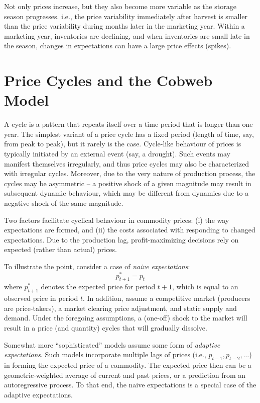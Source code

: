 \documentclass[
  oneside]{book}
\begin{document}
Not only prices increase, but they also become more variable as the storage season progresses. i.e., the price variability immediately after harvest is smaller than the price variability during months later in the marketing year. Within a marketing year, inventories are declining, and when inventories are small late in the season, changes in expectations can have a large price effects (spikes).

\hypertarget{price-cycles-and-the-cobweb-model}{%
\section{Price Cycles and the Cobweb Model}\label{price-cycles-and-the-cobweb-model}}

A cycle is a pattern that repeats itself over a time period that is longer than one year. The simplest variant of a price cycle has a fixed period (length of time, say, from peak to peak), but it rarely is the case. Cycle-like behaviour of prices is typically initiated by an external event (say, a drought). Such events may manifest themselves irregularly, and thus price cycles may also be characterized with irregular cycles. Moreover, due to the very nature of production process, the cycles may be asymmetric -- a positive shock of a given magnitude may result in subsequent dynamic behaviour, which may be different from dynamics due to a negative shock of the same magnitude.

Two factors facilitate cyclical behaviour in commodity prices:
(i) the way expectations are formed, and
(ii) the costs associated with responding to changed expectations.
Due to the production lag, profit-maximizing decisions rely on expected (rather than actual) prices.

To illustrate the point, consider a case of \emph{naive expectations}: \[p_{t+1}^{*} = p_{t}\] where \(p_{t+1}^{*}\) denotes the expected price for period \(t+1\), which is equal to an observed price in period \(t\). In addition, assume a competitive market (producers are price-takers), a market clearing price adjustment, and static supply and demand. Under the foregoing assumptions, a (one-off) shock to the market will result in a price (and quantity) cycles that will gradually dissolve.

Somewhat more ``sophisticated'' models assume some form of \emph{adaptive expectations}. Such models incorporate multiple lags of prices (i.e., \(p_{t-1},p_{t-2},\dots\)) in forming the expected price of a commodity. The expected price then can be a geometric-weighted average of current and past prices, or a prediction from an autoregressive process. To that end, the naive expectations is a special case of the adaptive expectations.
\end{document}
